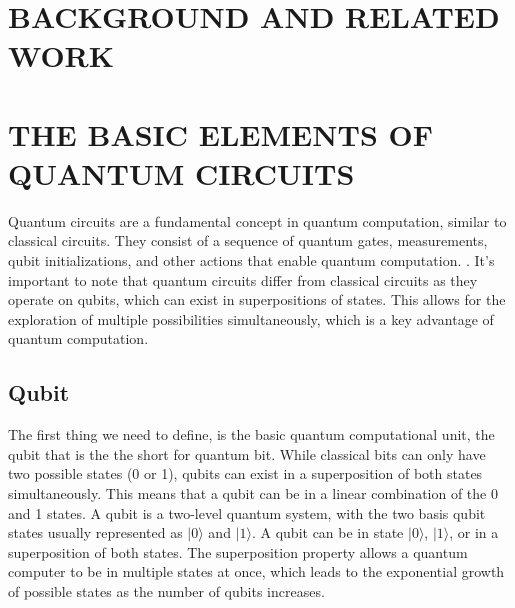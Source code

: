 \documentclass[inscr,ack,preface]{diphdthesis}
\begin{document}
\chapter{BACKGROUND AND RELATED WORK}

\chapter{THE BASIC ELEMENTS OF QUANTUM CIRCUITS}

Quantum circuits are a fundamental concept in quantum computation, similar to classical circuits. They consist of a sequence of quantum gates, measurements, qubit initializations, and other actions that enable quantum computation. \cite{niel}. It's important to note that quantum circuits differ from classical circuits as they operate on qubits, which can exist in superpositions of states. This allows for the exploration of multiple possibilities simultaneously, which is a key advantage of quantum computation. 

\section{Qubit}

The first thing we need to define, is the basic quantum computational unit, the qubit that is the the short for quantum bit. 
 While classical bits can only have two possible states (0 or 1), qubits can exist in a superposition of both states simultaneously. This means that a qubit can be in a linear combination of the 0 and 1 states. A qubit is a two-level quantum system, with the two basis qubit states usually represented as $\vert0\rangle$ and $\vert1\rangle$. A qubit can be in state $\vert0\rangle$, $\vert1\rangle$, or in a superposition of both states. The superposition property allows a quantum computer to be in multiple states at once, which leads to the exponential growth of possible states as the number of qubits increases.\cite{qubit}
 
\end{document}
